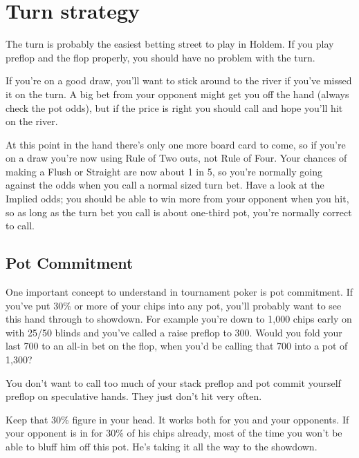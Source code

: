 \chapter{Turn strategy}


The turn is probably the easiest betting street to play in Holdem.
If you play preflop and the flop properly, you should have no
problem with the turn.

If you're on a good draw, you'll want to stick around to
the river if you've missed it on the turn. A big bet from your opponent
might get you off the hand (always check the pot odds), but if the price
is right you should call and hope you'll hit on the river.

At this point in the hand there's only one more board card to come,
so if you're on a draw you're now
using Rule of Two outs, not Rule of Four. Your chances of making
a Flush or Straight are now about 1 in 5, so you're normally going
against the odds when you call a normal sized turn bet. Have a look
at the Implied odds; you should be able to win more from your opponent
when you hit, so as long as the turn bet you call is about one-third pot,
you're normally correct to call.


\section{Pot Commitment}

One important concept to understand in tournament poker is pot
commitment. If you've put 30\% or more of your chips into any pot,
you'll probably want to see this hand through to showdown. For
example you're down to 1,000 chips early on with 25/50 blinds and you've
called a raise preflop to 300. Would you fold your last 700 to
an all-in bet on the flop, when you'd be calling that 700 into a
pot of 1,300?

You don't want to call too much of your stack preflop and
pot commit yourself preflop on speculative hands. They just don't
hit very often.

Keep that 30\% figure in your head. It works both
for you and your opponents. If your opponent is in for 30\% of his
chips already, most of the time you won't be able to bluff him off
this pot. He's taking it all the way to the showdown.

